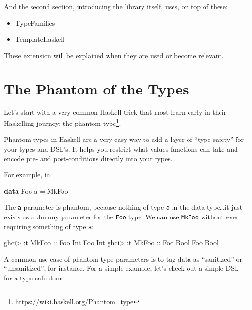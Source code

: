 \documentclass[]{article}
\newenvironment{Shaded}{}{}
\newcommand{\KeywordTok}[1]{\textcolor[rgb]{0.00,0.44,0.13}{\textbf{#1}}}
\newcommand{\DataTypeTok}[1]{\textcolor[rgb]{0.56,0.13,0.00}{#1}}
\newcommand{\OtherTok}[1]{\textcolor[rgb]{0.00,0.44,0.13}{#1}}
\newcommand{\FunctionTok}[1]{\textcolor[rgb]{0.02,0.16,0.49}{#1}}
\newcommand{\NormalTok}[1]{#1}
\renewcommand{\href}[2]{#2\footnote{\url{#1}}}
\begin{document}
And the second section, introducing the library itself, uses, on top of these:

\begin{itemize}
\tightlist
\item
  TypeFamilies
\item
  TemplateHaskell
\end{itemize}

These extension will be explained when they are used or become relevant.

\section{The Phantom of the Types}\label{the-phantom-of-the-types}

Let's start with a very common Haskell trick that most learn early in their
Haskelling journey: the \href{https://wiki.haskell.org/Phantom_type}{phantom
type}.

Phantom types in Haskell are a very easy way to add a layer of ``type safety''
for your types and DSL's. It helps you restrict what values functions can take
and encode pre- and post-conditions directly into your types.

For example, in

\begin{Shaded}
\begin{Highlighting}[]
\KeywordTok{data} \DataTypeTok{Foo}\NormalTok{ a }\FunctionTok{=} \DataTypeTok{MkFoo}
\end{Highlighting}
\end{Shaded}

The \texttt{a} parameter is phantom, because nothing of type \texttt{a} in the
data type\ldots{}it just exists as a dummy parameter for the \texttt{Foo} type.
We can use \texttt{MkFoo} without ever requiring something of type \texttt{a}:

\begin{Shaded}
\begin{Highlighting}[]
\NormalTok{ghci}\FunctionTok{>} \FunctionTok{:}\NormalTok{t }\DataTypeTok{MkFoo}\OtherTok{ ::} \DataTypeTok{Foo} \DataTypeTok{Int}
\DataTypeTok{Foo} \DataTypeTok{Int}
\NormalTok{ghci}\FunctionTok{>} \FunctionTok{:}\NormalTok{t }\DataTypeTok{MkFoo}\OtherTok{ ::} \DataTypeTok{Foo} \DataTypeTok{Bool}
\DataTypeTok{Foo} \DataTypeTok{Bool}
\end{Highlighting}
\end{Shaded}

A common use case of phantom type parameters is to tag data as ``sanitized'' or
``unsanitized'', for instance. For a simple example, let's check out a simple
DSL for a type-safe door:
\end{document}
